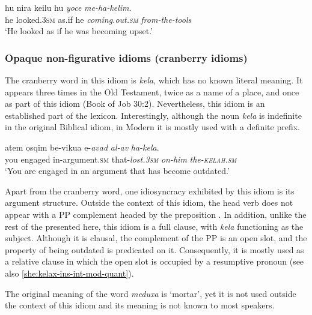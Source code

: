 \documentclass[output=paper]{langsci/langscibook}
\begin{document}
	\ea\label{she:kelim-canon}
	\gll hu nir{\alef}a ke{\alef}ilu hu \textit{yoce} \textit{me-ha-kelim}.\\
	   he looked.\textsc{3sm} as.if he \textit{coming.out.\textsc{sm}} \textit{from-the-tools}\\
	\glt `He looked as if he was becoming upset.'
	\z

\subsubsection{Opaque non-figurative idioms (cranberry idioms)}
\label{she:sec:cranberry}

The cranberry word in this idiom is \textit{kela{\het}}, which has no known literal meaning. It appears three times in the Old Testament, twice as a name of a place, and once as part of this idiom (Book of Job 30:2). Nevertheless, this idiom is an established part of the  lexicon. Interestingly, although the noun \textit{kela{\het}} is indefinite in the original Biblical idiom, in Modern  it is mostly used with a definite prefix.

	\ea\label{she:kelax-canon}
    	\gll {\alef}atem {\ayin}osqim be-vikua{\het} {\shin}e-\textit{{\alef}avad} \textit{{\ayin}al-av} \textit{ha-kela{\het}}.\\
    	   you engaged in-argument.\textsc{sm} that-\textit{lost.\textsc{3sm}} \textit{on-him} \textit{the-\textsc{kelah}.\textsc{sm}}\\
    	\glt `You are engaged in an argument that has become outdated.'
	\z

Apart from the cranberry word, one idiosyncracy exhibited by this idiom is its argument structure. Outside the context of this idiom, the head verb  does not appear with a PP complement headed by the preposition . In addition, unlike the rest of the  presented here, this idiom is a full clause, with \textit{kela{\het}} functioning as the subject. Although it is clausal, the complement of the PP is an open slot, and the property of being outdated is predicated on it. Consequently, it is mostly used as a relative clause in which the open slot is occupied by a resumptive pronoun (see also \ref{she:kelax-ins-int-mod-quant}).


 The original meaning of the word \textit{meduxa} is `mortar', yet it is not used outside the context of this idiom and its meaning is not known to most  speakers.
\end{document}
